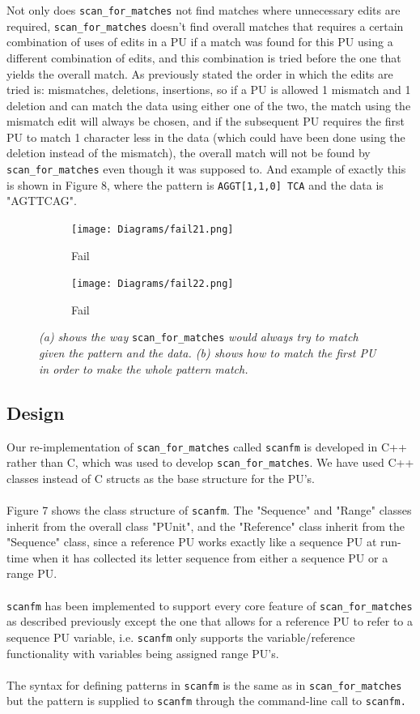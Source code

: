 \documentclass[12pt]{article}
\newcommand{\scm}{\texttt{scan\_for\_matches} }
\newcommand{\sfm}{\texttt{scanfm} }
\newcommand{\sfmp}{\texttt{scanfm.} }
\newcommand{\pu}{PU }
\newcommand{\pusp}{PU's. }
\newcommand{\pup}{PU. }
\begin{document}
\noindent Not only does \scm not find matches where unnecessary edits are required, \scm doesn't  
find overall matches that requires a certain combination of uses of edits in a \pu if a match was found for this
\pu using a different combination of edits, and this combination is tried before the one that yields the overall match.
As previously stated the order in which the edits are tried is: mismatches, deletions, insertions, so if
a \pu is allowed 1 mismatch and 1 deletion and can match the data using either one of the two, the match using the
mismatch edit will always be chosen, and if the subsequent \pu requires the first \pu to match 1 character less
in the data (which could have been done using the deletion instead of the mismatch), 
the overall match will not be found by \scm even though it was supposed to. And example of exactly this is shown in
Figure 8, where the pattern is \texttt{AGGT[1,1,0] TCA} and the data is "AGTTCAG".
\begin{figure}
\centering
\begin{subfigure}[b]{0.4 \textwidth}
\texttt{[image: Diagrams/fail21.png]}
\caption{Fail}
\end{subfigure}
\hspace{12mm}
\begin{subfigure}[b]{0.455 \textwidth}
\texttt{[image: Diagrams/fail22.png]}
\caption{Fail}
\end{subfigure}
\caption{\textit{(a) shows the way} \scm \textit{would always try to match given the pattern and the data.
(b) shows how to match the first \pu in order to make the whole pattern match.}}
\end{figure}
\subsection{Design}
Our re-implementation of \scm called \sfm is developed in C++ rather than C, which was used to develop 
\texttt{scan\_for\_matches}. We have used C++ classes instead of C structs as the base structure for the PU's. \\ \\ 
Figure 7 shows the class structure of \texttt{scanfm}. The "Sequence" and "Range" classes inherit from the overall
class "PUnit", and the "Reference" class inherit from the "Sequence" class, since a reference \pu works exactly like a 
sequence \pu at run-time when it has collected its letter sequence from either a sequence \pu or a range \pup \\ \\
\sfm has been implemented to support every core feature of \scm as described previously except the one
that allows for a reference \pu to refer to a sequence \pu variable, i.e. \sfm only supports the variable/reference
functionality with variables being assigned range \pusp \\ \\
The syntax for defining patterns in \sfm is the same as in \scm but the pattern is supplied to \sfm through 
the command-line call to \sfmp
\end{document}
